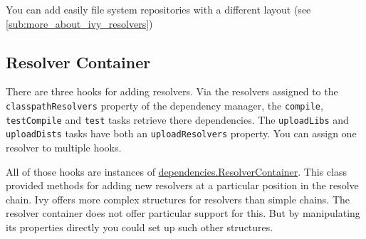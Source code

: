 You can add easily file system repositories with a different layout (see \ref{sub:more_about_ivy_resolvers})

\subsection{Resolver Container} %
\label{sub:resolver_container}
There are three hooks for adding resolvers. Via the resolvers assigned to the \texttt{classpathResolvers} property of the dependency manager, the \texttt{compile}, \texttt{testCompile} and \texttt{test} tasks retrieve there dependencies. The \texttt{uploadLibs} and \texttt{uploadDists} tasks have both an \texttt{uploadResolvers} property. You can assign one resolver to multiple hooks.

All of those hooks are instances of \href{\API dependencies/ResolverContainer.html}{\PKG dependencies.ResolverContainer}. This class provided methods for adding new resolvers at a particular position in the resolve chain. Ivy offers more complex structures for resolvers than simple chains. The resolver container does not offer particular support for this. But by manipulating its properties directly you could set up such other structures.

